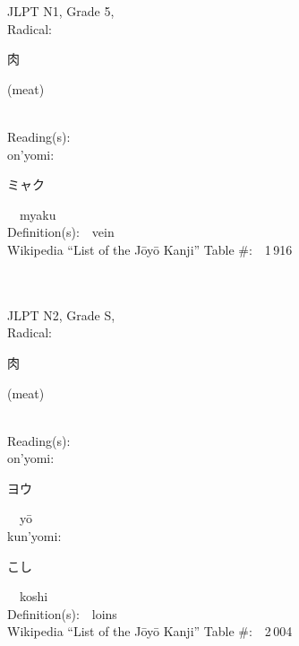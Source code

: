 \begin{multicols}{2}
{JLPT N1, Grade 5, \\Radical:\ \ {\begin{CJK}{UTF8}{min} 肉 \end{CJK}} (meat) } \\
Reading(s):\ \ \\
{\hspace*{1em}}on'yomi:\ \ \\
{\hspace*{2em}}{\begin{CJK}{UTF8}{min} ミャク \end{CJK}}\ \ myaku\ \ \\
Definition(s):\ \ vein \\
Wikipedia ``List of the J\=oy\=o Kanji'' Table \#:\ \ 1\,916 \\
\ \ \\
{\fontsize{34pt}{40pt}  }\ \ \\  %
{JLPT N2, Grade S, \\Radical:\ \ {\begin{CJK}{UTF8}{min} 肉 \end{CJK}} (meat) } \\
Reading(s):\ \ \\
{\hspace*{1em}}on'yomi:\ \ \\
{\hspace*{2em}}{\begin{CJK}{UTF8}{min} ヨウ \end{CJK}}\ \ y\=o\ \ \\
{\hspace*{1em}}kun'yomi:\ \ \\
{\hspace*{2em}}{\begin{CJK}{UTF8}{min} こし \end{CJK}}\ \ koshi\ \ \\
Definition(s):\ \ loins \\
Wikipedia ``List of the J\=oy\=o Kanji'' Table \#:\ \ 2\,004 \\
\ \ \\
{\fontsize{34pt}{40pt}  }\ \ \\  %

\end{multicols}
